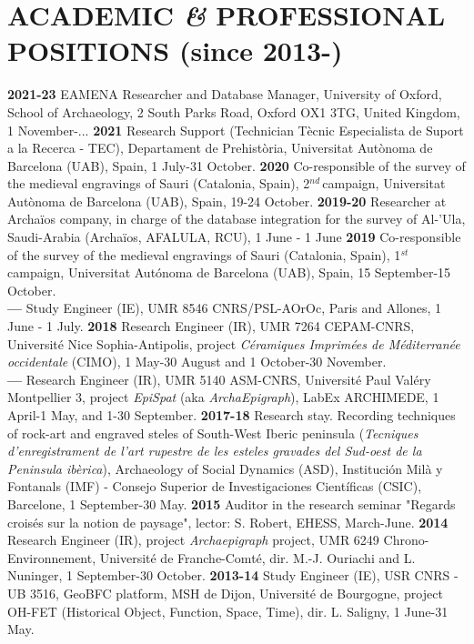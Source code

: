 \documentclass{article}
\begin{document}
\section{ACADEMIC \textit{\&} PROFESSIONAL POSITIONS (since 2013-)}

\textbf{2021-23 }EAMENA Researcher and Database Manager, University of Oxford, School of Archaeology, 2 South Parks Road, Oxford OX1 3TG, United Kingdom, 1 November-...
\smallbreak
\textbf{2021 }Research Support (Technician T\`{e}cnic Especialista de Suport a la Recerca - TEC), Departament de Prehist\`oria, Universitat Aut\`{o}noma de Barcelona (UAB), Spain, 1 July-31 October.
\smallbreak
\textbf{2020 }Co-responsible of the survey of the medieval engravings of Sauri (Catalonia, Spain), 2${}^{nd\ }$campaign, Universitat Aut\`{o}noma de Barcelona (UAB), Spain, 19-24 October.
\smallbreak
\textbf{2019-20 }Researcher at Archa\"{i}os company, in charge of the database integration for the survey of Al-'Ula, Saudi-Arabia (Archa\"{i}os, AFALULA, RCU), 1 June - 1 June
\smallbreak
\textbf{2019 }Co-responsible of the survey of the medieval engravings of Sauri (Catalonia, Spain), 1${}^{st\ }$campaign, Universitat Aut\'{o}noma de Barcelona (UAB), Spain, 15 September-15 October.\\
\textbf{--- }Study Engineer (IE), UMR 8546 CNRS/PSL-AOrOc, Paris and Allones, 1 June - 1 July.
\smallbreak
\textbf{2018 }Research Engineer (IR), UMR 7264 CEPAM-CNRS, Universit\'{e} Nice Sophia-Antipolis, project \textit{C\'{e}ramiques Imprim\'{e}es de M\'{e}diterran\'{e}e occidentale} (CIMO), 1 May-30 August and 1 October-30 November. \\
\textbf{--- }Research Engineer (IR), UMR 5140 ASM-CNRS, Universit\'{e} Paul Val\'{e}ry Montpellier 3, project \textit{EpiSpat} (aka \textit{ArchaEpigraph}), LabEx ARCHIMEDE, 1 April-1 May, and 1-30 September.
\smallbreak
\textbf{2017-18 }Research stay. Recording techniques of rock-art and engraved steles of South-West Iberic peninsula (\textit{Tecniques d'enregistrament de l'art rupestre de les esteles gravades del Sud-oest de la Peninsula ibèrica}), Archaeology of Social Dynamics (ASD), Instituci\'{o}n Mil\`{a} y Fontanals (IMF) - Consejo Superior de Investigaciones Cient\'{i}ficas (CSIC), Barcelone, 1 September-30 May.
\smallbreak
\textbf{2015 }Auditor in the research seminar "Regards crois\'{e}s sur la notion de paysage", lector: S. Robert, EHESS, March-June.\textbf{}
\smallbreak
\textbf{2014 }Research Engineer (IR), project \textit{Archaepigraph} project, UMR 6249 Chrono-Environnement, Universit\'{e} de Franche-Comt\'{e}, dir. M.-J. Ouriachi and L. Nuninger, 1 September-30 October.
\smallbreak
\textbf{2013-14 }Study Engineer (IE), USR CNRS - UB 3516, GeoBFC platform, MSH de Dijon, Universit\'{e} de Bourgogne, project OH-FET (Historical Object, Function, Space, Time), dir. L. Saligny, 1 June-31 May.
\end{document}
